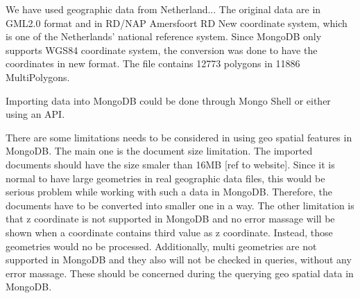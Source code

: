 \documentclass[a4paper,12pt]{article}
\begin{document}
We have used geographic data from Netherland...
The original data are in GML2.0 format and in RD/NAP Amersfoort RD New coordinate system, which is one of the Netherlands' national reference system. Since MongoDB only supports WGS84 coordinate system, the conversion was done to have the coordinates in new format. The file contains 12773 polygons in 11886 MultiPolygons. 

Importing data into MongoDB could be done through Mongo Shell or either using an API.

There are some limitations needs to be considered in using geo spatial features in MongoDB. The main one is the document size limitation. The imported documents should have the size smaler than 16MB [ref to website]. Since it is normal to have large geometries in real geographic data files, this would be serious problem while working with such a data in MongoDB. Therefore, the documents have to be converted into smaller one in a way. The other limitation is that z coordinate is not supported in MongoDB and no error massage will be shown when a coordinate contains third value as z coordinate. Instead, those geometries would no be processed. Additionally, multi geometries are not supported in MongoDB and they also will not be checked in queries, without any error massage. These should be concerned during the querying geo spatial data in MongoDB.
\end{document}

